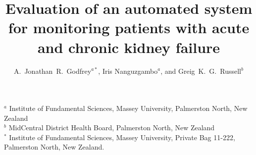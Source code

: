 \documentclass{article}
\begin{document}
\title{Evaluation of an automated system for monitoring patients with acute and chronic kidney failure}

\author{A.~Jonathan~R.~Godfrey$^{a*}$, Iris Nanguzgambo$^{a}$, and Greig~K.~G.~Russell$^{b}$}
\maketitle
\smallskip
\thispagestyle{empty}

$^a$ Institute of Fundamental Sciences, Massey University, Palmerston North, New Zealand\\

$^b$ MidCentral District Health Board, Palmerston North, New Zealand\\

$^*$ Institute of Fundamental Sciences, Massey University, Private Bag 11-222, Palmerston North, New Zealand. %










\label{LastPage}
\end{document}

